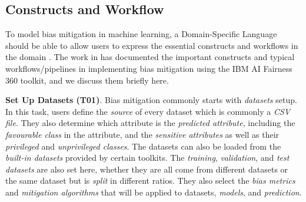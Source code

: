 \documentclass[sigconf,review]{acmart}
\begin{document}
{	\subsection{Constructs and Workflow}
	\label{sec:constructs_and_workflow}
	
	To model bias mitigation in machine learning, a Domain-Specific Language should be able to allow users to express the essential constructs and workflows in the domain \cite{volter2013model}. The work in \cite{bellamy2018ai} has documented the important constructs and typical workflows/pipelines in implementing bias mitigation using the IBM AI Fairness 360 toolkit, and we discuss them briefly here.
	
	
	\textbf{Set Up Datasets (T01)}. Bias mitigation commonly starts with \textit{datasets} setup. In this task, users define the \textit{source} of every dataset which is commonly a \textit{CSV file}. They also determine which attribute is the \textit{predicted attribute}, including the \textit{favourable class} in the attribute, and the \textit{sensitive attributes} as well as their \textit{privileged} and \textit{unprivileged classes}. The datasets can also be loaded from the \textit{built-in datasets} provided by certain toolkits. 
	The \textit{training}, \textit{validation}, and \textit{test datasets} are also set here, whether they are all come from different datasets or the same dataset but is \textit{split} in different ratios. They also select the \textit{bias metrics} and \textit{mitigation algorithms} that will be applied to datasets, \textit{models}, and \textit{prediction}. 
	
}
\end{document}
